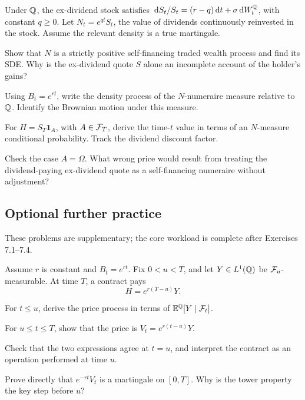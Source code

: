 \begin{exercise}
Under \(\mathbb Q\), the ex-dividend stock satisfies
\(\,\mathrm d S_t/S_t=(r-q)\,\mathrm d t+\sigma\,\mathrm d W_t^{\mathbb Q}\), with constant
\(q\geq0\). Let \(N_t=e^{qt}S_t\), the value of dividends continuously
reinvested in the stock. Assume the relevant density is a true martingale.
\begin{exparts}
\item Show that \(N\) is a strictly positive self-financing traded wealth process and find its SDE. Why is the ex-dividend quote \(S\) alone an incomplete account of the holder's gains?
\item Using \(B_t=e^{rt}\), write the density process of the \(N\)-numeraire measure relative to \(\mathbb Q\). Identify the Brownian motion under this measure.
\item For \(H=S_T\mathbf1_A\), with \(A\in\mathcal F_T\), derive the time-\(t\) value in terms of an \(N\)-measure conditional probability. Track the dividend discount factor.
\item Check the case \(A=\Omega\). What wrong price would result from treating the dividend-paying ex-dividend quote as a self-financing numeraire without adjustment?
\end{exparts}
\end{exercise}
\fi

\ifIncludeFurther
{}
\subsection*{Optional further practice}
\noindent These problems are supplementary; the core workload is complete after Exercises 7.1--7.4.
\setcounter{exercise}{4}
\begin{exercise}
Assume \(r\) is constant and \(B_t=e^{rt}\). Fix \(0<u<T\), and let
\(Y\in L^1(\mathbb Q)\) be \(\mathcal F_u\)-measurable. At time \(T\), a contract pays
\[
H=e^{r(T-u)}Y.
\]
\begin{exparts}
  \item For \(t\leq u\), derive the price process in terms of
  \(\mathbb E^{\mathbb Q}[Y\mid\mathcal F_t]\).
  \item For \(u\leq t\leq T\), show that the price is
  \(V_t=e^{r(t-u)}Y\).
  \item Check that the two expressions agree at \(t=u\), and interpret the
  contract as an operation performed at time \(u\).
  \item Prove directly that \(e^{-rt}V_t\) is a martingale on \([0,T]\).
  Why is the tower property the key step before \(u\)?
\end{exparts}
\end{exercise}

